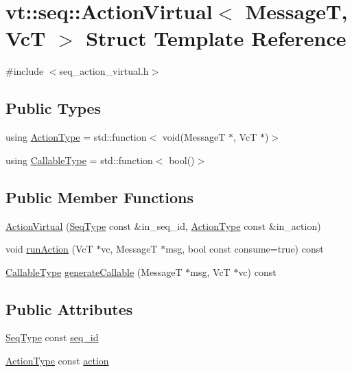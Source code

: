 \hypertarget{structvt_1_1seq_1_1_action_virtual}{}\section{vt\+:\+:seq\+:\+:Action\+Virtual$<$ MessageT, VcT $>$ Struct Template Reference}
\label{structvt_1_1seq_1_1_action_virtual}


{\ttfamily \#include $<$seq\+\_\+action\+\_\+virtual.\+h$>$}

\subsection*{Public Types}
\begin{DoxyCompactItemize}
\item 
using \hyperlink{structvt_1_1seq_1_1_action_virtual_a878b5933c67038a3b6e27aaa218693aa}{Action\+Type} = std\+::function$<$ void(MessageT $\ast$, VcT $\ast$)$>$
\item 
using \hyperlink{structvt_1_1seq_1_1_action_virtual_a34bde8c3ecdadca35bc183f5e0dcca1c}{Callable\+Type} = std\+::function$<$ bool()$>$
\end{DoxyCompactItemize}
\subsection*{Public Member Functions}
\begin{DoxyCompactItemize}
\item 
\hyperlink{structvt_1_1seq_1_1_action_virtual_a4ede676f74e0408e24db50f1bca7260a}{Action\+Virtual} (\hyperlink{namespacevt_1_1seq_a3b612da217ac669d39c159f134ab8434}{Seq\+Type} const \&in\+\_\+seq\+\_\+id, \hyperlink{structvt_1_1seq_1_1_action_virtual_a878b5933c67038a3b6e27aaa218693aa}{Action\+Type} const \&in\+\_\+action)
\item 
void \hyperlink{structvt_1_1seq_1_1_action_virtual_a922416441cccf4daf3969d05b57c99b2}{run\+Action} (VcT $\ast$vc, MessageT $\ast$msg, bool const consume=true) const
\item 
\hyperlink{structvt_1_1seq_1_1_action_virtual_a34bde8c3ecdadca35bc183f5e0dcca1c}{Callable\+Type} \hyperlink{structvt_1_1seq_1_1_action_virtual_a97c9c072c84663af96b333c8175f1e38}{generate\+Callable} (MessageT $\ast$msg, VcT $\ast$vc) const
\end{DoxyCompactItemize}
\subsection*{Public Attributes}
\begin{DoxyCompactItemize}
\item 
\hyperlink{namespacevt_1_1seq_a3b612da217ac669d39c159f134ab8434}{Seq\+Type} const \hyperlink{structvt_1_1seq_1_1_action_virtual_a24673f64e37cb0cc1d424cfe3defb606}{seq\+\_\+id}
\item 
\hyperlink{structvt_1_1seq_1_1_action_virtual_a878b5933c67038a3b6e27aaa218693aa}{Action\+Type} const \hyperlink{structvt_1_1seq_1_1_action_virtual_a438e5137b43bd3b61f8125ce55561d71}{action}
\end{DoxyCompactItemize}


